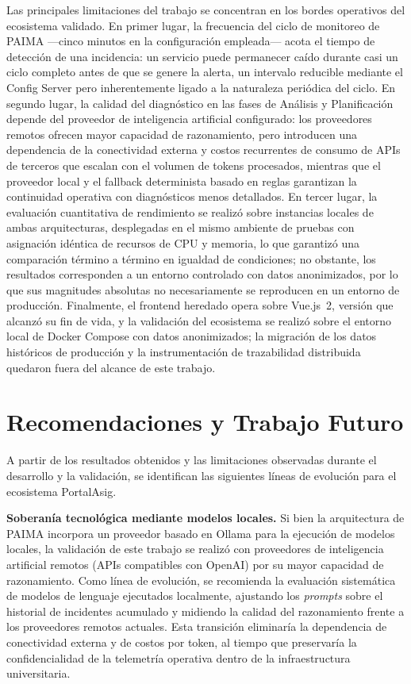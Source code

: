 Las principales limitaciones del trabajo se concentran en los bordes operativos del
ecosistema validado. En primer lugar, la frecuencia del ciclo de monitoreo de
PAIMA ---cinco minutos en la configuración empleada--- acota el tiempo de
detección de una incidencia: un servicio puede permanecer caído durante casi un
ciclo completo antes de que se genere la alerta, un intervalo reducible mediante
el Config Server pero inherentemente ligado a la naturaleza periódica del ciclo.
En segundo lugar, la calidad del diagnóstico en las fases de Análisis y
Planificación depende del proveedor de inteligencia artificial configurado: los
proveedores remotos ofrecen mayor capacidad de razonamiento, pero introducen
una dependencia de la conectividad externa y costos recurrentes de consumo de
APIs de terceros que escalan con el volumen de tokens procesados, mientras que el proveedor local y el fallback determinista
basado en reglas garantizan la continuidad operativa con diagnósticos menos
detallados. En tercer lugar, la evaluación cuantitativa de rendimiento se
realizó sobre instancias locales de ambas arquitecturas, desplegadas en el
mismo ambiente de pruebas con asignación idéntica de recursos de CPU y memoria,
lo que garantizó una comparación término a término en igualdad de condiciones;
no obstante, los resultados corresponden a un entorno controlado con datos
anonimizados, por lo que sus magnitudes absolutas no necesariamente se
reproducen en un entorno de producción. Finalmente, el frontend heredado opera sobre Vue.js~2,
versión que alcanzó su fin de vida, y la validación del ecosistema se realizó
sobre el entorno local de Docker Compose con datos anonimizados; la migración de
los datos históricos de producción y la instrumentación de trazabilidad
distribuida quedaron fuera del alcance de este trabajo.

\section{Recomendaciones y Trabajo Futuro}

A partir de los resultados obtenidos y las limitaciones observadas durante el
desarrollo y la validación, se identifican las siguientes líneas de evolución para
el ecosistema PortalAsig.

\textbf{Soberanía tecnológica mediante modelos locales.} Si bien la arquitectura
de PAIMA incorpora un proveedor basado en Ollama para la ejecución de modelos
locales, la validación de este trabajo se realizó con proveedores de inteligencia
artificial remotos (APIs compatibles con OpenAI) por su mayor capacidad de
razonamiento. Como línea de evolución, se recomienda la evaluación sistemática de
modelos de lenguaje ejecutados localmente, ajustando los \textit{prompts} sobre el
historial de incidentes acumulado y midiendo la calidad del razonamiento frente a
los proveedores remotos actuales. Esta transición eliminaría la dependencia de
conectividad externa y de costos por token, al tiempo que preservaría la
confidencialidad de la telemetría operativa dentro de la infraestructura
universitaria.

